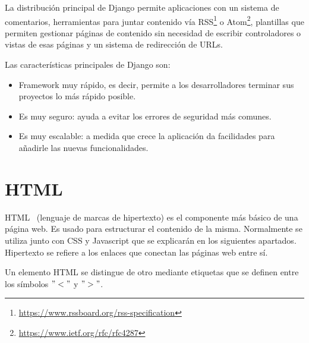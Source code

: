 \documentclass[a4paper, 12pt]{book}
\begin{document}
La distribución principal de Django permite aplicaciones con un sistema de comentarios, herramientas para juntar contenido vía RSS\footnote{\url{https://www.rssboard.org/rss-specification}} o Atom\footnote{\url{https://www.ietf.org/rfc/rfc4287}}, plantillas que permiten gestionar páginas de contenido sin necesidad de escribir controladores o vistas de esas páginas  y un sistema de redirección de URLs.

Las características principales de Django son:

\begin{itemize}
	\item Framework muy rápido, es decir, permite a los desarrolladores terminar sus proyectos lo más rápido posible.
	\item Es muy seguro: ayuda a evitar los errores de seguridad más comunes.
	\item Es muy escalable: a medida que crece la aplicación da facilidades para añadirle las nuevas funcionalidades.
\end{itemize} 

\section{HTML}
\label{sec:html}

HTML~\cite{website:HTML}  (lenguaje de marcas de hipertexto) es el componente más básico de una página web. Es usado para estructurar el contenido de la misma. Normalmente se utiliza junto con CSS y Javascript que se explicarán en los siguientes apartados.
Hipertexto se refiere a los enlaces que conectan las páginas web entre sí.

Un elemento HTML se distingue de otro mediante etiquetas que se definen entre los símbolos $"<"$ y $">"$. 
\end{document}
